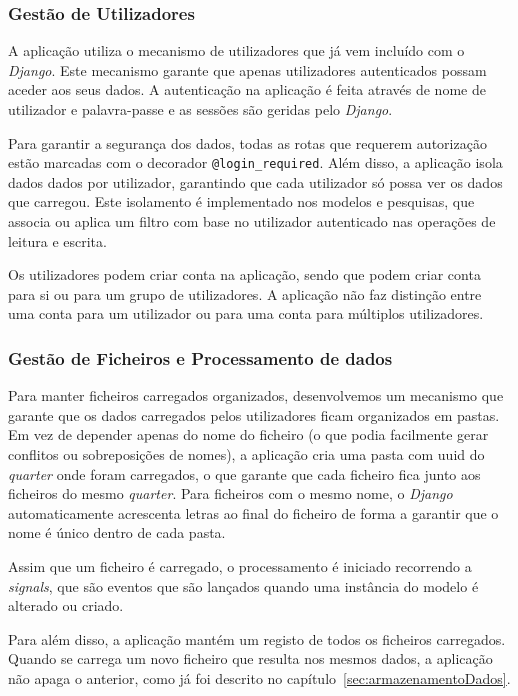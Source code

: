 \subsubsection{Gestão de Utilizadores}

A aplicação utiliza o mecanismo de utilizadores que já vem incluído com o \textit{Django}. Este mecanismo garante que apenas utilizadores autenticados possam aceder aos seus dados. A autenticação na aplicação é feita através de nome de utilizador e palavra-passe e as sessões são geridas pelo \textit{Django}.

Para garantir a segurança dos dados, todas as rotas que requerem autorização estão marcadas com o decorador \texttt{@login\_required}. Além disso, a aplicação isola dados dados por utilizador, garantindo que cada utilizador só possa ver os dados que carregou. Este isolamento é implementado nos modelos e pesquisas, que associa ou aplica um filtro com base no utilizador autenticado nas operações de leitura e escrita.

Os utilizadores podem criar conta na aplicação, sendo que podem criar conta para si ou para um grupo de utilizadores. A aplicação não faz distinção entre uma conta para um utilizador ou para uma conta para múltiplos utilizadores.

\subsubsection{Gestão de Ficheiros e Processamento de dados}

Para manter ficheiros carregados organizados, desenvolvemos um mecanismo que garante que os dados carregados pelos utilizadores ficam organizados em pastas. Em vez de depender apenas do nome do ficheiro (o que podia facilmente gerar conflitos ou sobreposições de nomes), a aplicação cria uma pasta com \gls{uuid} do \textit{quarter} onde foram carregados, o que garante que cada ficheiro fica junto aos ficheiros do mesmo \textit{quarter}. Para ficheiros com o mesmo nome, o \textit{Django} automaticamente acrescenta letras ao final do ficheiro de forma a garantir que o nome é único dentro de cada pasta.

Assim que um ficheiro é carregado, o processamento é iniciado recorrendo a \textit{signals}, que são eventos que são lançados quando uma instância do modelo é alterado ou criado.

Para além disso, a aplicação mantém um registo de todos os ficheiros carregados. Quando se carrega um novo ficheiro que resulta nos mesmos dados, a aplicação não apaga o anterior, como já foi descrito no capítulo~\ref{sec:armazenamentoDados}. 

